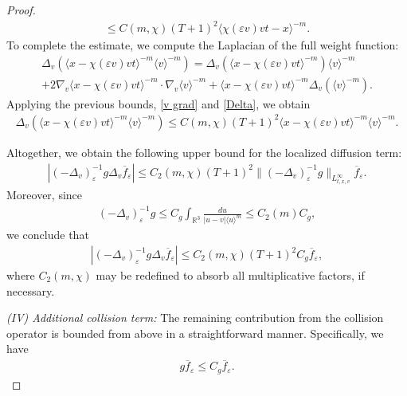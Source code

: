\documentclass[10pt,a4paper]{amsart}
\begin{document}
\begin{proof}
\begin{multline}
\le C(m,\chi)(T+1)^2 \langle \chi(\varepsilon v)vt - x\rangle^{-m}.\label{Delta}
\end{multline}
To complete the estimate, we compute the Laplacian of the full weight function:
\begin{multline*}
\Delta_v\left(\langle x-\chi(\varepsilon v)vt\rangle^{-m} \langle v\rangle^{-m}\right) = \Delta_v\left(\langle x-\chi(\varepsilon v)vt\rangle^{-m}\right)\langle v\rangle^{-m} \\ +2\nabla_v\langle x-\chi(\varepsilon v)vt\rangle^{-m}\cdot\nabla_v\langle v\rangle^{-m} +
\langle x-\chi(\varepsilon v)vt\rangle^{-m}\Delta_v\left(\langle v\rangle^{-m}\right).
\end{multline*}Applying the previous bounds, \eqref{v grad} and \eqref{Delta}, we obtain
\begin{align}\label{total Delta}
 \Delta_v\left(\langle x-\chi(\varepsilon v)vt\rangle^{-m} \langle v\rangle^{-m}\right)\le C(m,\chi)(T+1)^2\langle x-\chi(\varepsilon v)vt\rangle^{-m}\langle v\rangle^{-m}.
\end{align}

Altogether, we obtain the following upper bound for the localized diffusion term:
\begin{align*}
|(-\Delta_v)_\varepsilon^{-1}g\Delta_v\overline{f}_\varepsilon| \le C_2(m,\chi)(T+1)^2\lVert (-\Delta_v)_\varepsilon^{-1}g\rVert_{L^\infty_{t,x,v}} \overline{f}_\varepsilon.
\end{align*}Moreover, since
\begin{align*}
(-\Delta_v)_\varepsilon^{-1}g \le C_g \int_{\mathbb{R}^3} \frac{du}{|u-v|\langle u\rangle^m} \le C_2(m)C_g,
\end{align*}we conclude that
\begin{align}\label{Coll1 est}
|(-\Delta_v)_\varepsilon^{-1}g\Delta_v\overline{f}_\varepsilon| \le C_2(m,\chi)(T+1)^2C_g\overline{f}_\varepsilon,
\end{align}where $C_2(m,\chi)$ may be redefined to absorb all multiplicative factors, if necessary.

\noindent \textit{(IV) Additional collision term: }The remaining contribution from the collision operator is bounded from above in a straightforward manner. Specifically, we have
\begin{align}\label{Coll2 est}
g\overline{f}_\varepsilon \le C_g \overline{f}_\varepsilon.
\end{align}


\end{proof}
\end{document}
